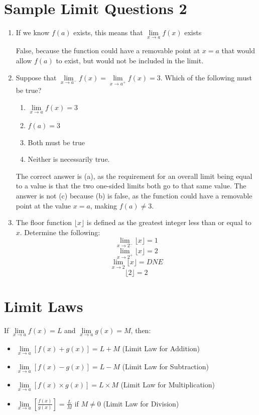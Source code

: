 \documentclass{article}
\begin{document}
\section{Sample Limit Questions 2}
\begin{enumerate}
\item If we know $f (a)$ exists, this means that $\underset{x\rightarrow{}a}{\lim}f (x)$ exists

False, because the function could have a removable point at $x = a$ that would allow $f (a)$ to
exist, but would not be included in the limit.

\item Suppose that $\underset{x\rightarrow{}a^{-}}{\lim}f (x) = \underset{x\rightarrow{}a^{+}}{\lim}f (x) = 3$.
Which of the following must be true?
    \begin{enumerate}
        \item $\underset{x\rightarrow{}a^{}}{\lim}f (x) = 3$
        \item $f (a) = 3$
        \item Both must be true
        \item Neither is necessarily true.
    \end{enumerate}

The correct answer is (a), as the requirement for an overall limit being equal to a value is that
the two one-sided limits both go to that same value. The answer is not (c) because (b) is false, as
the function could have a removable point at the value $x = a$, making $f (a) \neq 3$.

\item The floor function $\lfloor{}x\rfloor$ is defined as the greatest integer less than or equal to $x$.
Determine the following:
\[\underset{x\rightarrow{}2^{-}}{\lim}\lfloor{}x\rfloor = 1\]
\[\underset{x\rightarrow{}2^{+}}{\lim}\lfloor{}x\rfloor = 2\]
\[\underset{x\rightarrow{}2}{\lim}\lfloor{}x\rfloor = DNE\]
\[\lfloor{}2\rfloor = 2\]
\end{enumerate}

\pagebreak
\section{Limit Laws}
If $\underset{x\rightarrow{}a}{\lim}f (x) = L$ and $\underset{x\rightarrow{}a}{\lim}g (x) = M$, then:
\begin{itemize}
    \item $\underset{x\rightarrow{}a}{\lim}\left[f (x) + g (x)\right] = L + M$ (Limit Law for Addition)
    \item $\underset{x\rightarrow{}a}{\lim}\left[f (x) - g (x)\right] = L - M$ (Limit Law for Subtraction)
    \item $\underset{x\rightarrow{}a}{\lim}\left[f (x) \times g (x)\right] = L \times M$ (Limit Law for Multiplication)
    \item $\underset{x\rightarrow{}a}{\lim}\left[\frac{f (x)}{g (x)}\right] = \frac{L}{M}$ if $M \neq 0$ (Limit Law for Division)
\end{itemize}
\end{document}
